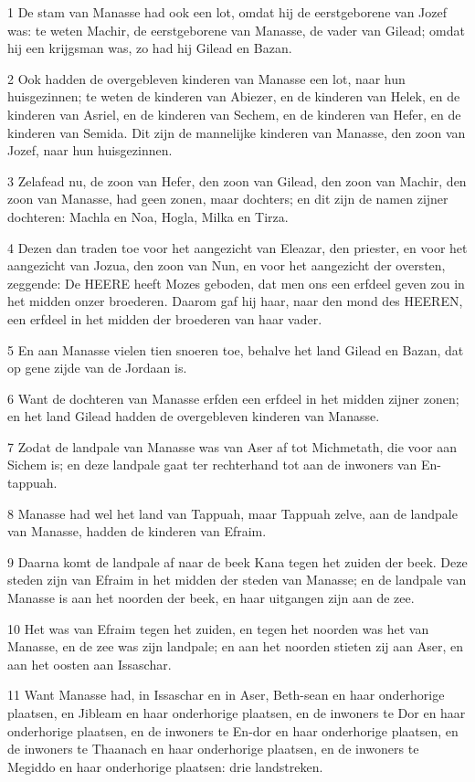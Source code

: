 \par 1 De stam van Manasse had ook een lot, omdat hij de eerstgeborene van Jozef was: te weten Machir, de eerstgeborene van Manasse, de vader van Gilead; omdat hij een krijgsman was, zo had hij Gilead en Bazan.
\par 2 Ook hadden de overgebleven kinderen van Manasse een lot, naar hun huisgezinnen; te weten de kinderen van Abiezer, en de kinderen van Helek, en de kinderen van Asriel, en de kinderen van Sechem, en de kinderen van Hefer, en de kinderen van Semida. Dit zijn de mannelijke kinderen van Manasse, den zoon van Jozef, naar hun huisgezinnen.
\par 3 Zelafead nu, de zoon van Hefer, den zoon van Gilead, den zoon van Machir, den zoon van Manasse, had geen zonen, maar dochters; en dit zijn de namen zijner dochteren: Machla en Noa, Hogla, Milka en Tirza.
\par 4 Dezen dan traden toe voor het aangezicht van Eleazar, den priester, en voor het aangezicht van Jozua, den zoon van Nun, en voor het aangezicht der oversten, zeggende: De HEERE heeft Mozes geboden, dat men ons een erfdeel geven zou in het midden onzer broederen. Daarom gaf hij haar, naar den mond des HEEREN, een erfdeel in het midden der broederen van haar vader.
\par 5 En aan Manasse vielen tien snoeren toe, behalve het land Gilead en Bazan, dat op gene zijde van de Jordaan is.
\par 6 Want de dochteren van Manasse erfden een erfdeel in het midden zijner zonen; en het land Gilead hadden de overgebleven kinderen van Manasse.
\par 7 Zodat de landpale van Manasse was van Aser af tot Michmetath, die voor aan Sichem is; en deze landpale gaat ter rechterhand tot aan de inwoners van En-tappuah.
\par 8 Manasse had wel het land van Tappuah, maar Tappuah zelve, aan de landpale van Manasse, hadden de kinderen van Efraim.
\par 9 Daarna komt de landpale af naar de beek Kana tegen het zuiden der beek. Deze steden zijn van Efraim in het midden der steden van Manasse; en de landpale van Manasse is aan het noorden der beek, en haar uitgangen zijn aan de zee.
\par 10 Het was van Efraim tegen het zuiden, en tegen het noorden was het van Manasse, en de zee was zijn landpale; en aan het noorden stieten zij aan Aser, en aan het oosten aan Issaschar.
\par 11 Want Manasse had, in Issaschar en in Aser, Beth-sean en haar onderhorige plaatsen, en Jibleam en haar onderhorige plaatsen, en de inwoners te Dor en haar onderhorige plaatsen, en de inwoners te En-dor en haar onderhorige plaatsen, en de inwoners te Thaanach en haar onderhorige plaatsen, en de inwoners te Megiddo en haar onderhorige plaatsen: drie landstreken.

